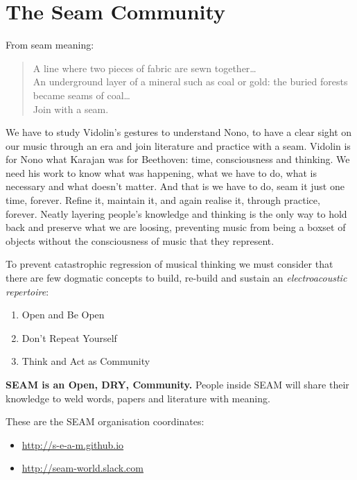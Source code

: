 \documentclass[twoside,a4paper]{article}
\begin{document}
\section{The Seam Community}
\label{sec:seam}

From seam meaning:

\begin{quote}
\begin{it}
A line where two pieces of fabric are sewn together\ldots \\
An underground layer of a mineral such as coal or gold: the buried forests became seams of coal\ldots\\
Join with a seam.
\end{it}
\end{quote}

We have to study Vidolin's gestures to understand Nono, to have a clear sight on our music through an era and join literature and practice with a seam. Vidolin is for Nono what Karajan was for Beethoven: time, consciousness and thinking. We need his work to know what was happening, what we have to do, what is necessary and what doesn't matter. And that is we have to do, seam it just one time, forever. Refine it, maintain it, and again realise it, through practice, forever. Neatly layering people's knowledge and thinking is the only way to hold back and preserve what we are loosing, preventing music from being a boxset of objects without the consciousness of music that they represent. 

To prevent catastrophic regression of musical thinking we must consider that there are few dogmatic concepts to build, re-build and sustain an \emph{electroacoustic repertoire}:
\begin{enumerate}
  \item Open and Be Open
  \item Don't Repeat Yourself
  \item Think and Act as Community
\end{enumerate}

\textbf{SEAM is an Open, DRY, Community.} People inside SEAM will share their knowledge to weld words, papers and literature with meaning.

These are the SEAM organisation coordinates: 
\begin{itemize}
\item \url{http://s-e-a-m.github.io}
\item \url{http://seam-world.slack.com}
\end{itemize}
\end{document}
